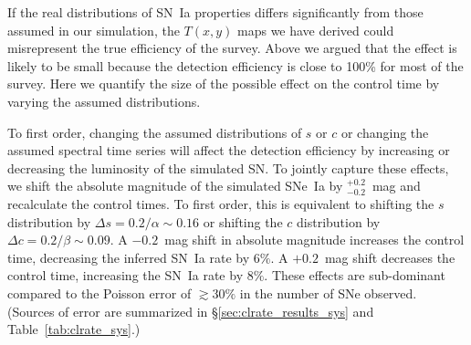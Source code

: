 
If the real distributions of SN~Ia properties differs significantly
from those assumed in our simulation, the $T(x,y)$ maps we have
derived could misrepresent the true efficiency of the survey. Above we
argued that the effect is likely to be small because the detection
efficiency is close to 100\% for most of the survey. Here we quantify
the size of the possible effect on the control time by varying the
assumed distributions.

To first order, changing the assumed distributions of $s$ or $c$ or
changing the assumed spectral time series will affect the detection
efficiency by increasing or decreasing the luminosity of the simulated
SN. To jointly capture these effects, we shift the absolute magnitude
of the simulated SNe~Ia by $^{+0.2}_{-0.2}$~mag and recalculate the
control times. To first order, this is equivalent to shifting the $s$
distribution by $\Delta s = 0.2/\alpha \sim 0.16$ or shifting the $c$
distribution by $\Delta c = 0.2/\beta \sim 0.09$. A $-0.2$~mag shift
in absolute magnitude increases the control time, decreasing the
inferred SN~Ia rate by $6\%$. A $+0.2$~mag shift decreases the control
time, increasing the SN~Ia rate by $8\%$. These effects are
sub-dominant compared to the Poisson error of $\gtrsim 30\%$ in the
number of SNe observed. (Sources of error are summarized
in \S\ref{sec:clrate_results_sys} and Table~\ref{tab:clrate_sys}.)




